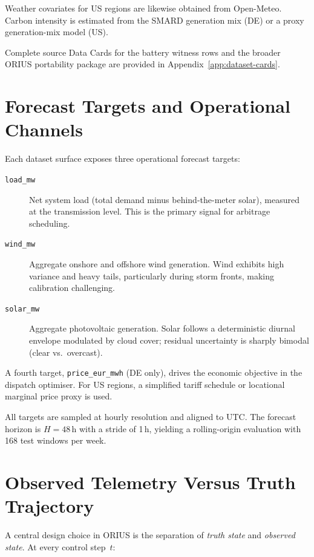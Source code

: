 Weather covariates for US regions are likewise obtained from Open-Meteo.
Carbon intensity is estimated from the SMARD generation mix (DE) or a
proxy generation-mix model (US).

Complete source Data Cards for the battery witness rows and the broader
ORIUS portability package are provided in Appendix~\ref{app:dataset-cards}.

\section{Forecast Targets and Operational Channels}

Each dataset surface exposes three operational forecast targets:

\begin{description}
  \item[\texttt{load\_mw}] Net system load (total demand minus behind-the-meter
    solar), measured at the transmission level.  This is the primary signal for
    arbitrage scheduling.
  \item[\texttt{wind\_mw}] Aggregate onshore and offshore wind generation.
    Wind exhibits high variance and heavy tails, particularly during storm
    fronts, making calibration challenging.
  \item[\texttt{solar\_mw}] Aggregate photovoltaic generation.  Solar follows a
    deterministic diurnal envelope modulated by cloud cover; residual
    uncertainty is sharply bimodal (clear vs.\ overcast).
\end{description}

A fourth target, \texttt{price\_eur\_mwh} (DE only), drives the economic
objective in the dispatch optimiser.  For US regions, a simplified tariff
schedule or locational marginal price proxy is used.

All targets are sampled at hourly resolution and aligned to UTC.  The forecast
horizon is $H = 48$\,h with a stride of 1\,h, yielding a rolling-origin
evaluation with 168 test windows per week.

\section{Observed Telemetry Versus Truth Trajectory}

A central design choice in ORIUS is the separation of \emph{truth state}
and \emph{observed state}.  At every control step~$t$:

